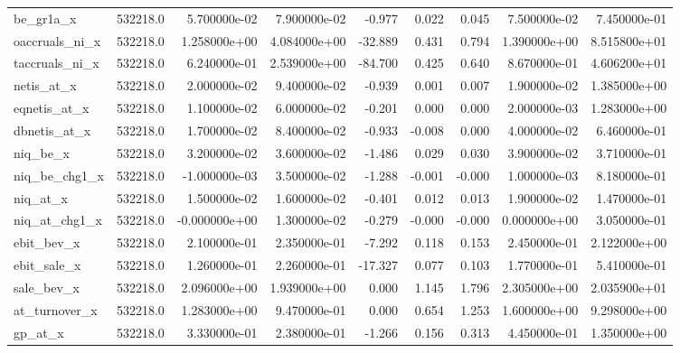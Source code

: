 \documentclass[12pt]{article}
\begin{document}
\begin{landscape}
\begin{longtable}{|l|r|r|r|r|r|r|r|r|}
		be\_gr1a\_x              & 532218.0 & 5.700000e-02  & 7.900000e-02 & -0.977     & 0.022       & 0.045       & 7.500000e-02  & 7.450000e-01 \\
		oaccruals\_ni\_x         & 532218.0 & 1.258000e+00  & 4.084000e+00 & -32.889    & 0.431       & 0.794       & 1.390000e+00  & 8.515800e+01 \\
		taccruals\_ni\_x         & 532218.0 & 6.240000e-01  & 2.539000e+00 & -84.700    & 0.425       & 0.640       & 8.670000e-01  & 4.606200e+01 \\
		netis\_at\_x             & 532218.0 & 2.000000e-02  & 9.400000e-02 & -0.939     & 0.001       & 0.007       & 1.900000e-02  & 1.385000e+00 \\
		eqnetis\_at\_x           & 532218.0 & 1.100000e-02  & 6.000000e-02 & -0.201     & 0.000       & 0.000       & 2.000000e-03  & 1.283000e+00 \\
		dbnetis\_at\_x           & 532218.0 & 1.700000e-02  & 8.400000e-02 & -0.933     & -0.008      & 0.000       & 4.000000e-02  & 6.460000e-01 \\
		niq\_be\_x               & 532218.0 & 3.200000e-02  & 3.600000e-02 & -1.486     & 0.029       & 0.030       & 3.900000e-02  & 3.710000e-01 \\
		niq\_be\_chg1\_x         & 532218.0 & -1.000000e-03 & 3.500000e-02 & -1.288     & -0.001      & -0.000      & 1.000000e-03  & 8.180000e-01 \\
		niq\_at\_x               & 532218.0 & 1.500000e-02  & 1.600000e-02 & -0.401     & 0.012       & 0.013       & 1.900000e-02  & 1.470000e-01 \\
		niq\_at\_chg1\_x         & 532218.0 & -0.000000e+00 & 1.300000e-02 & -0.279     & -0.000      & -0.000      & 0.000000e+00  & 3.050000e-01 \\
		ebit\_bev\_x             & 532218.0 & 2.100000e-01  & 2.350000e-01 & -7.292     & 0.118       & 0.153       & 2.450000e-01  & 2.122000e+00 \\
		ebit\_sale\_x            & 532218.0 & 1.260000e-01  & 2.260000e-01 & -17.327    & 0.077       & 0.103       & 1.770000e-01  & 5.410000e-01 \\
		sale\_bev\_x             & 532218.0 & 2.096000e+00  & 1.939000e+00 & 0.000      & 1.145       & 1.796       & 2.305000e+00  & 2.035900e+01 \\
		at\_turnover\_x          & 532218.0 & 1.283000e+00  & 9.470000e-01 & 0.000      & 0.654       & 1.253       & 1.600000e+00  & 9.298000e+00 \\
		gp\_at\_x                & 532218.0 & 3.330000e-01  & 2.380000e-01 & -1.266     & 0.156       & 0.313       & 4.450000e-01  & 1.350000e+00 \\

\end{longtable}
\end{landscape}
\end{document}
